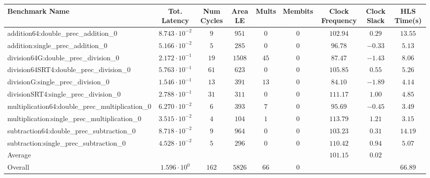 \begin{tabular}{|l|c|c|c|c|c|c|c|c|}
\hline
Benchmark Name                                   & Tot. Latency            & Num Cycles & Area LE  & Mults  & Membits & Clock Frequency & Clock Slack & HLS Time(s) \\
\hline
addition64:double\_prec\_addition\_0             & $ 8.743 \cdot 10^{-2} $ & $ 9      $ & $ 951  $ & $ 0  $ & $ 0   $ & $ 102.94      $ & $ 0.29    $ & $ 13.55   $ \\
addition:single\_prec\_addition\_0               & $ 5.166 \cdot 10^{-2} $ & $ 5      $ & $ 285  $ & $ 0  $ & $ 0   $ & $ 96.78       $ & $ -0.33   $ & $ 5.13    $ \\
division64G:double\_prec\_division\_0            & $ 2.172 \cdot 10^{-1} $ & $ 19     $ & $ 1508 $ & $ 45 $ & $ 0   $ & $ 87.47       $ & $ -1.43   $ & $ 8.06    $ \\
division64SRT4:double\_prec\_division\_0         & $ 5.763 \cdot 10^{-1} $ & $ 61     $ & $ 623  $ & $ 0  $ & $ 0   $ & $ 105.85      $ & $ 0.55    $ & $ 5.26    $ \\
divisionG:single\_prec\_division\_0              & $ 1.546 \cdot 10^{-1} $ & $ 13     $ & $ 391  $ & $ 13 $ & $ 0   $ & $ 84.10       $ & $ -1.89   $ & $ 4.14    $ \\
divisionSRT4:single\_prec\_division\_0           & $ 2.788 \cdot 10^{-1} $ & $ 31     $ & $ 311  $ & $ 0  $ & $ 0   $ & $ 111.17      $ & $ 1.00    $ & $ 4.85    $ \\
multiplication64:double\_prec\_multiplication\_0 & $ 6.270 \cdot 10^{-2} $ & $ 6      $ & $ 393  $ & $ 7  $ & $ 0   $ & $ 95.69       $ & $ -0.45   $ & $ 3.49    $ \\
multiplication:single\_prec\_multiplication\_0   & $ 3.515 \cdot 10^{-2} $ & $ 4      $ & $ 104  $ & $ 1  $ & $ 0   $ & $ 113.79      $ & $ 1.21    $ & $ 3.15    $ \\
subtraction64:double\_prec\_subtraction\_0       & $ 8.718 \cdot 10^{-2} $ & $ 9      $ & $ 964  $ & $ 0  $ & $ 0   $ & $ 103.23      $ & $ 0.31    $ & $ 14.19   $ \\
subtraction:single\_prec\_subtraction\_0         & $ 4.528 \cdot 10^{-2} $ & $ 5      $ & $ 296  $ & $ 0  $ & $ 0   $ & $ 110.42      $ & $ 0.94    $ & $ 5.07    $ \\
\hline
Average                                          & $                     $ & $        $ & $      $ & $    $ & $     $ & $ 101.15      $ & $ 0.02    $ & $         $ \\
\hline
Overall                                          & $ 1.596 \cdot 10^{0}  $ & $ 162    $ & $ 5826 $ & $ 66 $ & $ 0   $ & $             $ & $         $ & $ 66.89   $ \\
\hline
\end{tabular}
